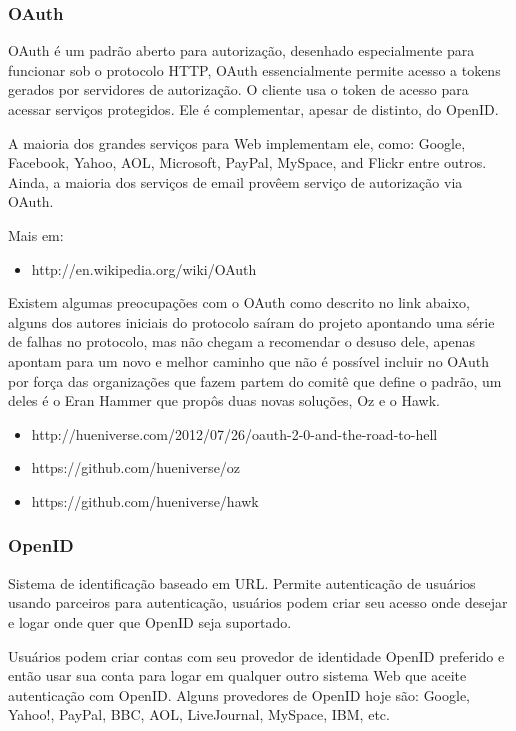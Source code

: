 \documentclass[11pt]{article}
\begin{document}
\subsubsection{OAuth}

OAuth é um padrão aberto para autorização, desenhado especialmente para
funcionar sob o protocolo HTTP, OAuth essencialmente permite acesso a tokens
gerados por servidores de autorização. O cliente usa o token de acesso para
acessar serviços protegidos. Ele é complementar, apesar de distinto, do OpenID.

A maioria dos grandes serviços para Web implementam ele, como: Google,
Facebook, Yahoo, AOL, Microsoft, PayPal, MySpace, and Flickr entre outros.
Ainda, a maioria dos serviços de email provêem serviço de autorização via
OAuth.

Mais em:
\begin{itemize}
  \item{http://en.wikipedia.org/wiki/OAuth}
\end{itemize}

Existem algumas preocupações com o OAuth como descrito no link abaixo, alguns
dos autores iniciais do protocolo saíram do projeto apontando uma série de
falhas no protocolo, mas não chegam a recomendar o desuso dele, apenas apontam
para um novo e melhor caminho que não é possível incluir no OAuth por força
das organizações que fazem partem do comitê que define o padrão, um deles é o
Eran Hammer que propôs duas novas soluções, Oz e o Hawk.

\begin{itemize}
  \item{http://hueniverse.com/2012/07/26/oauth-2-0-and-the-road-to-hell}
  \item{https://github.com/hueniverse/oz}
  \item{https://github.com/hueniverse/hawk}
\end{itemize}

\subsubsection{OpenID}

Sistema de identificação baseado em URL. Permite autenticação de usuários
usando parceiros para autenticação, usuários podem criar seu acesso onde
desejar e logar onde quer que OpenID seja suportado.

Usuários podem criar contas com seu provedor de identidade OpenID preferido e
então usar sua conta para logar em qualquer outro sistema Web que aceite
autenticação com OpenID. Alguns provedores de OpenID hoje são: Google, Yahoo!,
PayPal, BBC, AOL, LiveJournal, MySpace, IBM, etc.
\end{document}
